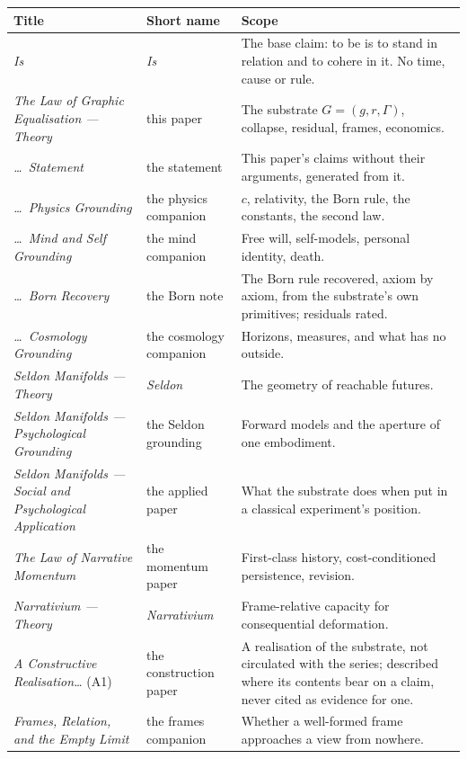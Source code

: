 \documentclass[11pt,a4paper]{article}
\theoremstyle{remark}\newtheorem{remark}[definition]{Remark}
\begin{document}
\begin{center}\small
\begin{tabular}{@{}>{\raggedright\arraybackslash}p{}>{\raggedright\arraybackslash}p{}>{\raggedright\arraybackslash}p{}@{}}
\toprule
\textbf{Title} & \textbf{Short name} & \textbf{Scope}\\
\midrule
\emph{Is} & \emph{Is} & The base claim: to be is to stand in relation and to cohere in it. No time, cause or rule.\\
\emph{The Law of Graphic Equalisation --- Theory} & this paper & The substrate $G=(g,r,\Gamma)$, collapse, residual, frames, economics.\\
\emph{\ldots\ Statement} & the statement & This paper's claims without their arguments, generated from it.\\
\emph{\ldots\ Physics Grounding} & the physics companion & $c$, relativity, the Born rule, the constants, the second law.\\
\emph{\ldots\ Mind and Self Grounding} & the mind companion & Free will, self-models, personal identity, death.\\
\emph{\ldots\ Born Recovery} & the Born note & The Born rule recovered, axiom by axiom, from the substrate's own primitives; residuals rated.\\
\emph{\ldots\ Cosmology Grounding} & the cosmology companion & Horizons, measures, and what has no outside.\\
\emph{Seldon Manifolds --- Theory} & \emph{Seldon} & The geometry of reachable futures.\\
\emph{Seldon Manifolds --- Psychological Grounding} & the Seldon grounding & Forward models and the aperture of one embodiment.\\
\emph{Seldon Manifolds --- Social and Psychological Application} & the applied paper & What the substrate does when put in a classical experiment's position.\\
\emph{The Law of Narrative Momentum} & the momentum paper & First-class history, cost-conditioned persistence, revision.\\
\emph{Narrativium --- Theory} & \emph{Narrativium} & Frame-relative capacity for consequential deformation.\\
\emph{A Constructive Realisation\ldots} (A1) & the construction paper & A realisation of the substrate, not circulated with the series; described where its contents bear on a claim, never cited as evidence for one.\\
\emph{Frames, Relation, and the Empty Limit} & the frames companion & Whether a well-formed frame approaches a view from nowhere.\\

\end{tabular}
\end{center}
\end{document}
